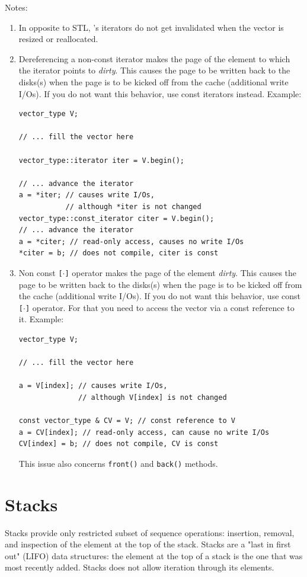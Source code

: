 \documentclass[twoside]{book}
\begin{document}
Notes:
\begin{enumerate}
\item In opposite to STL, \xvector 's iterators do not get invalidated
when the vector is resized or reallocated.
\item Dereferencing a non-const iterator makes the page of the element
to which the iterator points to \emph{dirty}. This causes the page to
be written back to the disks(s) when the page is to be kicked off from
the cache (additional write I/Os). If you do not want this behavior,
use const iterators instead. Example:
\begin{lstlisting}
vector_type V;

// ... fill the vector here

vector_type::iterator iter = V.begin();

// ... advance the iterator
a = *iter; // causes write I/Os,
           // although *iter is not changed
vector_type::const_iterator citer = V.begin();
// ... advance the iterator
a = *citer; // read-only access, causes no write I/Os
*citer = b; // does not compile, citer is const

\end{lstlisting}
\item Non const \texttt{[$\cdot$]} operator makes the page of the
element \emph{dirty}. This causes the page to
be written back to the disks(s) when the page is to be kicked off from
the cache (additional write I/Os). If you do not want this behavior,
use const \texttt{[$\cdot$]} operator. For that you need to access the
vector via a const reference to it. Example:
\begin{lstlisting}
vector_type V;

// ... fill the vector here

a = V[index]; // causes write I/Os, 
              // although V[index] is not changed

const vector_type & CV = V; // const reference to V
a = CV[index]; // read-only access, can cause no write I/Os
CV[index] = b; // does not compile, CV is const
\end{lstlisting}
This issue also concerns \texttt{front()} and \texttt{back()} methods.
\end{enumerate}

\newcommand{\xstack}{\texttt{stxxl::stack}}

\section{Stacks}
\label{stacksection}
Stacks provide only restricted subset of
sequence operations: insertion, removal, and inspection of the element
at the top of the stack. Stacks are a "last in first out" (LIFO) data
structures: the element at the top of a stack is the one that was most
recently added. Stacks does not allow iteration through its
elements. 
\end{document}
